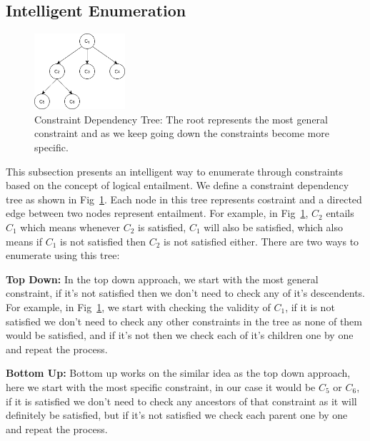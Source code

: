 \documentclass{article}
\begin{document}
\subsection{Intelligent Enumeration}
\label{subsec:intelEnum}
\begin{figure}[tb]
    \centering
\includegraphics[width=0.3\textwidth]{images/constraintTree.png}
    \caption{\label{fig:constraintTree} Constraint Dependency Tree: The root represents the most general constraint and as we keep going down the constraints become more specific.}
\end{figure}
This subsection presents an intelligent way to enumerate through constraints based on the concept of logical entailment. We define a constraint dependency tree as shown in Fig~\ref{fig:constraintTree}. Each node in this tree represents costraint and a directed edge between two nodes represent entailment. For example, in Fig~\ref{fig:constraintTree}, $C_2$ entails $C_1$ which means whenever $C_2$ is satisfied, $C_1$ will also be satisfied, which also means if $C_1$ is not satisfied then $C_2$ is not satisfied either.
There are two ways to enumerate using this tree:
 
\textbf{Top Down:} In the top down approach, we start with the most general constraint, if it's not satisfied then we don't need to check any of it's descendents. For example, in Fig~\ref{fig:constraintTree}, we start with checking the validity of $C_1$, if it is not satisfied we don't need to check any other constraints in the tree as none of them would be satisfied, and if it's not then we check each of it's children one by one and repeat the process.

\textbf{Bottom Up:} Bottom up works on the similar idea as the top down approach, here we start with the most specific constraint, in our case it would be $C_5$ or $C_6$, if it is satisfied we don't need to check any ancestors of that constraint as it will definitely be satisfied, but if it's not satisfied we check each parent one by one and repeat the process.
\end{document}
